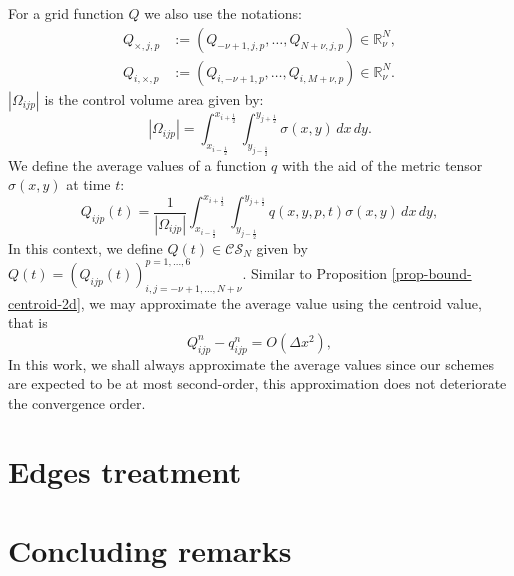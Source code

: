 For a grid function $Q$ we also use the notations:
\begin{align*}
	Q_{\times,j,p} &:= (Q_{-\nu+1,j,p}, \ldots, Q_{N+\nu,j,p}) \in \mathbb{R}^{N}_{\nu},\\
	Q_{i,\times,p} &:= (Q_{i,-\nu+1,p}, \ldots, Q_{i,M+\nu,p}) \in \mathbb{R}^{N}_{\nu}.
\end{align*}
$|\Omega_{ijp}|$ is the control volume area given by:
\begin{equation}
	\label{chp4-area}
	|\Omega_{ijp}| = \int_{x_{i-\frac{1}{2}}}^{x_{i+\frac{1}{2}}} \int_{y_{j-\frac{1}{2}}}^{y_{j+\frac{1}{2}}}{\sigma(x,y)} \,dx \,dy.
\end{equation}
We define the average values of a function $q$ with the aid of the metric tensor
$\sigma(x,y)$ at time $t$: 
\begin{equation*}
	Q_{ijp}(t) = \frac{1}{|\Omega_{ijp}|}\int_{x_{i-\frac{1}{2}}}^{x_{i+\frac{1}{2}}}
	\int_{y_{j-\frac{1}{2}}}^{y_{j+\frac{1}{2}}}  q(x,y,p,t) {\sigma(x,y)}\,dx \,dy,
\end{equation*}
In this context, we define $Q(t) \in \mathcal{CS}_N$ given by 
$Q(t) = (Q_{ijp}(t))_{i,j = -\nu +1, \ldots, N+\nu}^{p=1,\ldots,6}$.
Similar to Proposition \ref{prop-bound-centroid-2d}, we may approximate the average value using the centroid value, that is
\begin{equation*}
	Q_{ijp}^n - q_{ijp}^n = O(\Delta x ^2), 
\end{equation*}
In this work, we shall always approximate the average values since our schemes are expected to be at most second-order,
this approximation does not deteriorate the convergence order.

\section{Edges treatment}
\label{cs-halodata}

\section{Concluding remarks}
\label{cs-conc}
